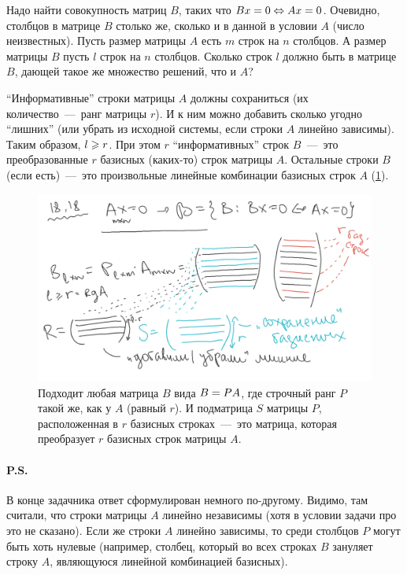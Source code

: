 \documentclass[a4paper,12pt]{article}
\begin{document}
  \begin{solution}
    Надо найти совокупность матриц $B$, таких что $Bx \hm= 0 \hm\Leftrightarrow Ax \hm= 0$.
    Очевидно, столбцов в матрице $B$ столько же, сколько и в данной в условии $A$ (число неизвестных).
    Пусть размер матрицы $A$ есть $m$ строк на $n$ столбцов.
    А размер матрицы $B$ пусть $l$ строк на $n$ столбцов.
    Сколько строк $l$ должно быть в матрице $B$, дающей такое же множество решений, что и $A$?
    
    ``Информативные'' строки матрицы $A$ должны сохраниться (их количество~---~ранг матрицы $r$).
    И к ним можно добавить сколько угодно ``лишних'' (или убрать из исходной системы, если строки $A$ линейно зависимы).
    Таким образом, $l \hm\geq r$.
    При этом $r$ ``информативных'' строк $B$~---~это преобразованные $r$ базисных (каких-то) строк матрицы $A$.
    Остальные строки $B$ (если есть)~---~это произвольные линейные комбинации базисных строк $A$ (\ref{fig:colourful-rows}).

    \begin{figure}[h]
      \centering
    
      \includegraphics[width=0.8\columnwidth]{18.18.png}
    
      \caption{Подходит любая матрица $B$ вида $B \hm= PA$, где строчный ранг $P$ такой же, как у $A$ (равный $r$).
      И подматрица $S$ матрицы $P$, расположенная в $r$ базисных строках~---~это матрица, которая преобразует $r$ базисных строк матрицы $A$.}
      \label{fig:colourful-rows}
    \end{figure}
    
    \paragraph{P.S.}
    В конце задачника ответ сформулирован немного по-другому.
    Видимо, там считали, что строки матрицы $A$ линейно независимы (хотя в условии задачи про это не сказано).
    Если же строки $A$ линейно зависимы, то среди столбцов $P$ могут быть хоть нулевые (например, столбец, который во всех строках $B$ зануляет строку $A$, являющуюся линейной комбинацией базисных).
  \end{solution}
\end{document}
